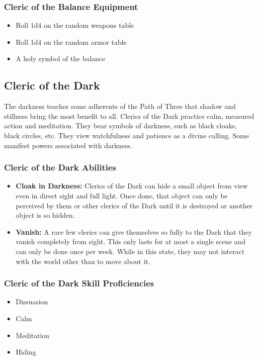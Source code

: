 \begin{multicols}{2}
\subsubsection{Cleric of the Balance Equipment}

\begin{itemize}
  \item Roll 1d4 on the random weapons table
  \item Roll 1d4 on the random armor table
  \item A holy symbol of the balance
\end{itemize}

\subsection{Cleric of the Dark}

The darkness teaches some adherents of the Path of Three that shadow and stillness
bring the most benefit to all. Clerics of the Dark practice calm, measured
action and meditation. They bear symbols of darkness, such as black cloaks,
black circles, etc. They view watchfulness and patience as a divine calling.
Some manifest powers associated with darkness.

\subsubsection{Cleric of the Dark Abilities}

\begin{itemize}
  \item \textbf{Cloak in Darkness:} Clerics of the Dark can hide a small object
    from view even in direct sight and full light. Once done, that object can only
    be perceived by them or other clerics of the Dark until it is destroyed or
    another object is so hidden.
  \item \textbf{Vanish:} A rare few clerics can give themselves so fully to the
    Dark that they vanish completely from sight. This only lasts for at most a single
    scene and can only be done once per week. While in this state, they may not
    interact with the world other than to move about it.
\end{itemize}

\subsubsection{Cleric of the Dark Skill Proficiencies}

\begin{itemize}
  \item Dissuasion
  \item Calm
  \item Meditation
  \item Hiding
\end{itemize}


\end{multicols}
